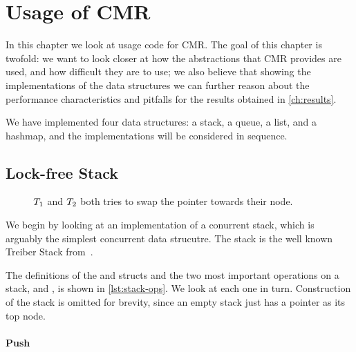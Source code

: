\chapter{Usage of CMR\label{ch:usage}}

In this chapter we look at usage code for CMR\@. The goal of this chapter is twofold: we want to
look closer at how the abstractions that CMR provides are used, and how difficult they are to use;
we also believe that showing the implementations of the data structures we can further reason about
the performance characteristics and pitfalls for the results obtained in \cref{ch:results}.

We have implemented four data structures: a stack, a queue, a list, and a hashmap, and the
implementations will be considered in sequence.


\clearpage


\section{Lock-free Stack\label{sec:usage-stack}}

\begin{figure}[b]
\centering

\caption{$T\sb{1}$ and $T\sb{2}$ both tries to swap the  pointer towards their
node.}
\end{figure}

We begin by looking at an implementation of a conurrent stack, which is arguably the simplest
concurrent data strucutre. The stack is the well known Treiber Stack
from~\cite{treiber1986systems}.

The definitions of the  and  structs and the two most important operations
on a stack,  and , is shown in \cref{lst:stack-ops}. We look at each one in
turn. Construction of the stack is omitted for brevity, since an empty stack just has a 
pointer as its top node.

\begin{figure}[ht]

\end{figure}

\subsubsection{Push}

